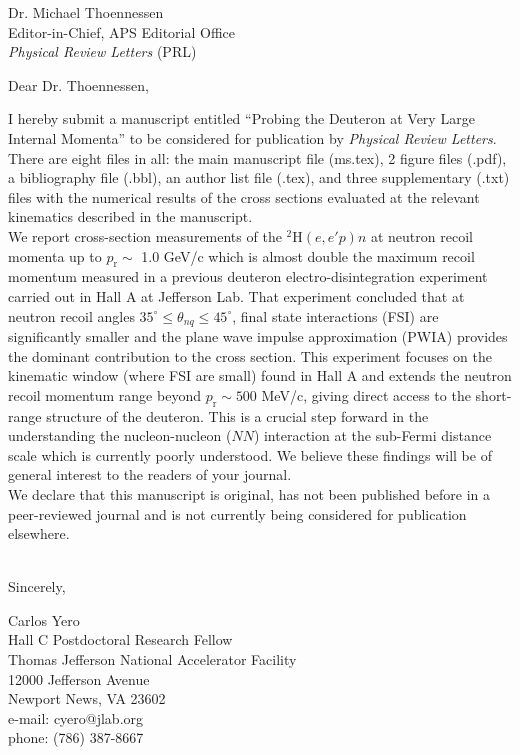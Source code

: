 \documentclass{letter}
\begin{document}
\begin{letter}{
    Dr. Michael Thoennessen\\
    Editor-in-Chief, APS Editorial Office \\
    \textit{Physical Review Letters} (PRL)\\
    }


\opening{Dear Dr. Thoennessen,\\}

I hereby submit a manuscript entitled ``Probing the Deuteron at Very Large Internal Momenta'' to be considered for publication by \textit{Physical Review Letters}.
There are eight files in all: the main manuscript file (ms.tex), 2 figure files (.pdf), a bibliography file (.bbl), an author list file (.tex), and three supplementary (.txt)
files with the numerical results of the cross sections evaluated at the relevant kinematics described in the manuscript.\\

We report cross-section measurements of the $^{2}$H$(e,e'p)n$ at neutron recoil momenta up to $p_{\mathrm{r}}\sim$ 1.0 GeV/c which is almost
double the maximum recoil momentum measured in a previous deuteron electro-disintegration experiment carried out in Hall A at Jefferson Lab.
That experiment concluded that at neutron recoil angles $35^{\circ}\leq \theta_{nq}\leq 45^{\circ}$, final state interactions (FSI) are significantly
smaller and the plane wave impulse approximation (PWIA) provides the dominant contribution to the cross section. This experiment focuses
on the kinematic window (where FSI are small) found in Hall A and extends the neutron recoil momentum range beyond $p_{\mathrm{r}}\sim500$ MeV/c, giving
direct access to the short-range structure of the deuteron. This is a crucial step forward in the understanding the nucleon-nucleon ($NN$) interaction at 
the sub-Fermi distance scale which is currently poorly understood. We believe these findings will be of general interest to the readers of your journal.\\

We declare that this manuscript is original, has not been published before in a peer-reviewed journal and is not currently being considered for publication elsewhere.\\
\\
\closing{Sincerely,
}
Carlos Yero\\
Hall C Postdoctoral Research Fellow\\
Thomas Jefferson National Accelerator Facility\\
12000 Jefferson Avenue \\
Newport News, VA 23602\\
e-mail: cyero@jlab.org\\
phone: (786) 387-8667 

\end{letter}
\end{document}
